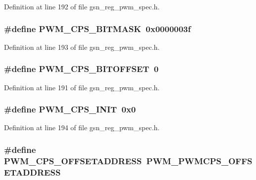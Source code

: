 Definition at line 192 of file gsn\_\-reg\_\-pwm\_\-spec.h.

\hypertarget{a00565_a2bff5ec88be76abb7d9b1a79c7a4b1f2}{
\subsubsection[{PWM\_\-CPS\_\-BITMASK}]{\setlength{\rightskip}{0pt plus 5cm}\#define PWM\_\-CPS\_\-BITMASK~0x0000003f}}
\label{a00565_a2bff5ec88be76abb7d9b1a79c7a4b1f2}


Definition at line 193 of file gsn\_\-reg\_\-pwm\_\-spec.h.

\hypertarget{a00565_a1bbad1be0bd416872c86c6bbd7aecabc}{
\subsubsection[{PWM\_\-CPS\_\-BITOFFSET}]{\setlength{\rightskip}{0pt plus 5cm}\#define PWM\_\-CPS\_\-BITOFFSET~0}}
\label{a00565_a1bbad1be0bd416872c86c6bbd7aecabc}


Definition at line 191 of file gsn\_\-reg\_\-pwm\_\-spec.h.

\hypertarget{a00565_a656dfbd9b57eba7c922b69a1a96e50a3}{
\subsubsection[{PWM\_\-CPS\_\-INIT}]{\setlength{\rightskip}{0pt plus 5cm}\#define PWM\_\-CPS\_\-INIT~0x0}}
\label{a00565_a656dfbd9b57eba7c922b69a1a96e50a3}


Definition at line 194 of file gsn\_\-reg\_\-pwm\_\-spec.h.

\hypertarget{a00565_a73d74355f535b5295698ee741a1fc8b3}{
\subsubsection[{PWM\_\-CPS\_\-OFFSETADDRESS}]{\setlength{\rightskip}{0pt plus 5cm}\#define PWM\_\-CPS\_\-OFFSETADDRESS~PWM\_\-PWMCPS\_\-OFFSETADDRESS}}
\label{a00565_a73d74355f535b5295698ee741a1fc8b3}


